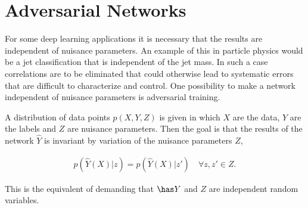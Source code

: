 \documentclass[12pt, a4paper]{thesis}
\begin{document}
\section{Adversarial Networks}

For some deep learning applications it is necessary that the results
are independent of nuisance parameters. An example of this in particle
physics would be a jet classification that is independent of the jet
mass. In such a case correlations are to be eliminated that could
otherwise lead to systematic errors that are difficult to characterize
and control. One possibility to make a network independent of nuisance
parameters is adversarial training.

A distribution of data points \(p(X, Y, Z)\) is given in which \(X\)
are the data, \(Y\) are the labels and \(Z\) are nuisance parameters.
Then the goal is that the results of the network \(\hat Y\) is
invariant by variation of the nuisance parameters \(Z\),

\begin{align}
  p(\hat Y(X)| z) = p(\hat Y(X)| z') \quad \forall z,z' \in Z.
\end{align}

This is the equivalent of demanding that \(\has Y\) and \(Z\) are
independent random variables.
\end{document}
